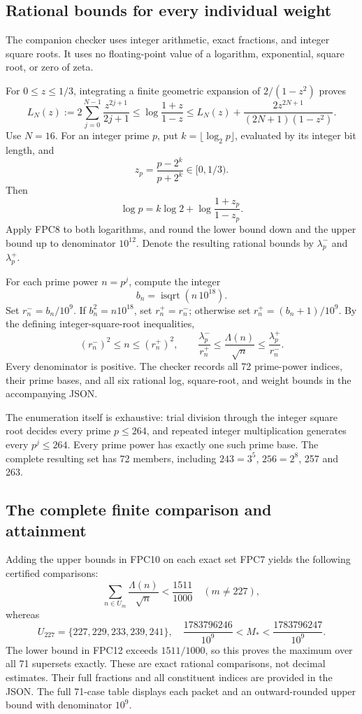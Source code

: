 \documentclass[
  10pt,
  a4paper,
]{article}
\begin{document}
\subsection{Rational bounds for every individual
weight}\label{rational-bounds-for-every-individual-weight}

The companion checker uses integer arithmetic, exact fractions, and
integer square roots. It uses no floating-point value of a logarithm,
exponential, square root, or zero of zeta.

For \(0\le z\le1/3\), integrating a finite geometric expansion of
\(2/(1-z^2)\) proves \[
L_N(z):=2\sum_{j=0}^{N-1}\frac{z^{2j+1}}{2j+1}
\le \log\frac{1+z}{1-z}
\le L_N(z)+\frac{2z^{2N+1}}{(2N+1)(1-z^2)}.
\tag{FPC8}
\] Use \(N=16\). For an integer prime \(p\), put
\(k=\lfloor\log_2p\rfloor\), evaluated by its integer bit length, and \[
z_p=\frac{p-2^k}{p+2^k}\in[0,1/3).
\] Then \[
\log p=k\log2+\log\frac{1+z_p}{1-z_p}.
\tag{FPC9}
\] Apply FPC8 to both logarithms, and round the lower bound down and the
upper bound up to denominator \(10^{12}\). Denote the resulting rational
bounds by \(\lambda_p^-\) and \(\lambda_p^+\).

For each prime power \(n=p^j\), compute the integer \[
b_n=\operatorname{isqrt}(n\,10^{18}).
\] Set \(r_n^-=b_n/10^9\). If \(b_n^2=n10^{18}\), set \(r_n^+=r_n^-\);
otherwise set \(r_n^+=(b_n+1)/10^9\). By the defining
integer-square-root inequalities, \[
(r_n^-)^2\le n\le(r_n^+)^2,
\qquad
\frac{\lambda_p^-}{r_n^+}
\le\frac{\Lambda(n)}{\sqrt n}
\le\frac{\lambda_p^+}{r_n^-}.
\tag{FPC10}
\] Every denominator is positive. The checker records all 72 prime-power
indices, their prime bases, and all six rational log, square-root, and
weight bounds in the accompanying JSON.

The enumeration itself is exhaustive: trial division through the integer
square root decides every prime \(p\le264\), and repeated integer
multiplication generates every \(p^j\le264\). Every prime power has
exactly one such prime base. The complete resulting set has 72 members,
including \(243=3^5\), \(256=2^8\), 257 and 263.

\subsection{The complete finite comparison and
attainment}\label{the-complete-finite-comparison-and-attainment}

Adding the upper bounds in FPC10 on each exact set FPC7 yields the
following certified comparisons: \[
\sum_{n\in U_m}\frac{\Lambda(n)}{\sqrt n}
<\frac{1511}{1000}\quad(m\ne227),
\tag{FPC11}
\] whereas \[
U_{227}=\{227,229,233,239,241\},
\quad
\frac{1783796246}{10^9}<M_*<\frac{1783796247}{10^9}.
\tag{FPC12}
\] The lower bound in FPC12 exceeds \(1511/1000\), so this proves the
maximum over all 71 supersets exactly. These are exact rational
comparisons, not decimal estimates. Their full fractions and all
constituent indices are provided in the JSON. The full 71-case table
displays each packet and an outward-rounded upper bound with denominator
\(10^9\).
\end{document}
